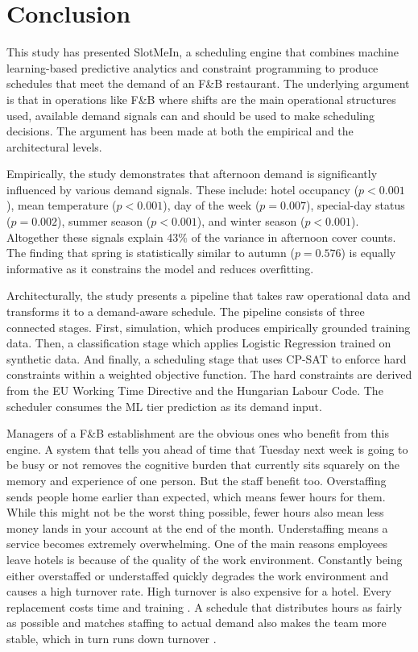 \documentclass[12pt,a4paper,oneside]{article}
\begin{document}
\section{Conclusion}
\label{sec:conclusion}


This study has presented SlotMeIn, a scheduling engine that combines machine learning-based predictive analytics and constraint programming to produce schedules that meet the demand of an F\&B restaurant. The underlying argument is that in operations like F\&B where shifts are the main operational structures used, available demand signals can and should be used to make scheduling decisions. The argument has been made at both the empirical and the architectural levels.


Empirically, the study demonstrates that afternoon demand is significantly influenced by various demand signals. These include:
hotel occupancy ($p < 0.001$), mean temperature ($p < 0.001$), day of the week ($p = 0.007$), special-day status ($p = 0.002$), summer season ($p < 0.001$), and winter season ($p < 0.001$). Altogether these signals explain 43\% of the variance in afternoon cover counts. The finding that spring is statistically similar to autumn ($p = 0.576$) is equally informative as it constrains the model and reduces overfitting.

Architecturally, the study presents a pipeline that takes raw operational data and transforms it to a demand-aware schedule. The pipeline consists of three connected stages. First, simulation, which produces empirically grounded training data. Then, a classification stage which applies Logistic Regression trained on synthetic data. And finally, a scheduling stage that uses CP-SAT to enforce hard constraints within a weighted objective function. The hard constraints are derived from the EU Working Time Directive and the Hungarian Labour Code. The scheduler consumes the ML tier prediction as its demand input.

Managers of a F\&B establishment are the obvious ones who benefit from this engine. A system that tells you ahead of time that Tuesday next week is going to be busy or not removes the cognitive burden that currently sits squarely on the memory and experience of one person.  But the staff benefit too.  Overstaffing sends people home earlier than expected, which means fewer hours for them.  While this might not be the worst thing possible, fewer hours also mean less money lands in your account at the end of the month. Understaffing means a service becomes extremely overwhelming. One of the main reasons employees leave hotels is because of the quality of the work environment. Constantly being either overstaffed or understaffed quickly degrades the work environment and causes a high turnover rate. High turnover is also expensive for a hotel. Every replacement costs time and training \citep{tracey2008}. A schedule that distributes hours as fairly as possible and matches staffing to actual demand also makes the team more stable, which in turn runs down turnover \citep{pham2022, karatepe2020}.
\end{document}
